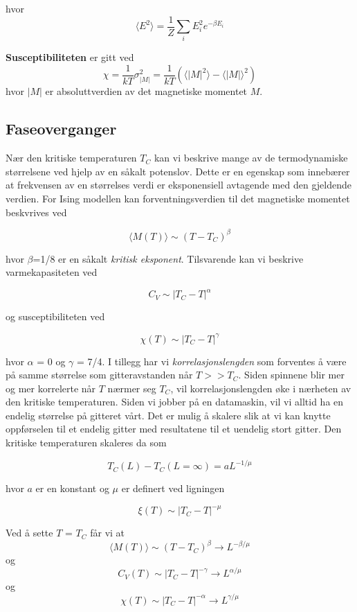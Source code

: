 \documentclass[11pt,a4paper]{article}
\begin{document}
hvor 
\begin{equation}
\langle E^2 \rangle = \frac{1}{Z} \sum_i E_i^2 e^{- \beta E_i}
\end{equation}

\textbf{Susceptibiliteten} er gitt ved
\begin{equation}
\chi = \frac{1}{kT} \sigma_{|M|}^2 = \frac{1}{kT}( \langle |M|^2 \rangle - \langle |M| \rangle^2 )
\end{equation}
hvor $|M |$ er absoluttverdien av det magnetiske momentet $M$.

\subsection{Faseoverganger}
Nær den kritiske temperaturen $T_C$ kan vi beskrive mange av de termodynamiske størrelsene ved hjelp av en såkalt potenslov. Dette er en egenskap som innebærer at frekvensen av en størrelses verdi er eksponensiell avtagende med den gjeldende verdien. For Ising modellen kan forventningsverdien til det magnetiske momentet beskvrives ved

\[ \langle M(T) \rangle \sim (T - T_C)^\beta \]

hvor $\beta$=1/8 er en såkalt \textit{kritisk eksponent}. Tilsvarende kan vi beskrive varmekapasiteten ved

\[ C_V \sim |T_C - T|^\alpha \]

og susceptibiliteten ved

\[ \chi(T) \sim |T_C - T|^\gamma  \]

hvor $\alpha$ = 0 og $\gamma$ = 7/4. I tillegg har vi \textit{korrelasjonslengden} som forventes å være på samme størrelse som gitteravstanden når $T >> T_C$. Siden spinnene blir mer og mer korrelerte når $T$ nærmer seg $T_C$, vil korrelasjonslengden øke i nærheten av den kritiske temperaturen. Siden vi jobber på en datamaskin, vil vi alltid ha en endelig størrelse på gitteret vårt. Det er mulig å skalere slik at vi kan knytte oppførselen til  et endelig gitter med resultatene til et uendelig stort gitter. Den kritiske temperaturen skaleres da som

\[T_C(L) - T_C(L=\infty ) = aL^{-1/\mu}  \]

hvor $a$ er en konstant og $\mu$ er definert ved ligningen

\[\xi (T) \sim |T_C - T|^{-\mu} \]

Ved å sette $T$ = $T_C$ får vi at
\[ \langle M(T) \rangle \sim (T-T_C)^\beta \rightarrow L^{-\beta/\mu} \]
og
\[C_V(T) \sim |T_C-T|^{-\gamma} \rightarrow L^{\alpha/\mu} \]
og
\[ \chi (T) \sim |T_C - T|^{-\alpha} \rightarrow L^{\gamma / \mu } \]
\end{document}
